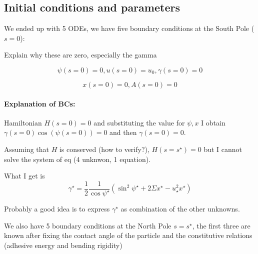 \documentclass[12pt]{article}
\begin{document}







\subsection{Initial conditions and parameters}
We ended up with 5 ODEs, we have five boundary conditions at the South Pole ($s=0$):

\alert{Explain why these are zero, especially the gamma }

$$
\psi(s=0)=0, u(s=0)=u_0, \gamma(s=0)=0
$$

$$
x(s=0) = 0, A(s=0)=0
$$

\paragraph*{Explanation of BCs:}
Hamiltonian $H(s=0)=0$ and substituting the value for $\psi,x$ I obtain $\gamma(s=0) \cos(\psi(s=0))=0$ and then $\gamma(s=0)=0$. 

Assuming that $H$ is conserved (\alert{how to verify?}), $H(s=s^\star)=0$ but I cannot solve the system of eq (4 unknwon, 1 equation).

What I get is $$
\gamma^\star=\frac{1}{2} \frac{1}{\cos \psi^\star} \left(\sin ^2 \psi^\star +2 \Sigma x^\star - u_\star^2 x^\star \right)
$$

Probably a good idea is to express $\gamma^\star$ as combination of the other unknowns.





We also have 5 boundary conditions at the North Pole $s=s^\star$, the first three are known after fixing the contact angle of the particle and the constitutive relations (adhesive energy and bending rigidity) 
\end{document}

